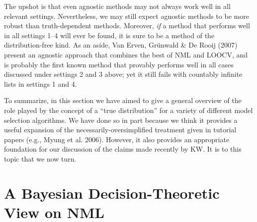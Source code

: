\documentclass[authoryear]{elsarticle}
\newcommand{\kw}{KW}
\begin{document}
The upshot is that even agnostic methods may not always work well in
all relevant settings. Nevertheless, we may still expect agnostic
methods to be more robust than truth-dependent methods. Moreover, {\em
  if\/} a method that performs well in all settings 1--4 will ever be
found, it is sure to be a method of the distribution-free kind. As an
aside, Van Erven, Gr\"unwald \& De Rooij (2007) present an agnostic
approach that combines the best of NML and LOOCV, and is probably the
first known method that provably performs well in all cases discussed
under settings 2 and 3 above; yet it still fails with countably
infinite lists in settings 1 and 4.

To summarize, in this section we have aimed to give a general
overview of the role played by the concept of a ``true distribution''
for a variety of different model selection algorithms. We have done so in
part because we think it provides a useful expansion of the
necessarily-oversimplified
treatment given in tutorial papers (e.g., Myung et al. 2006). However,
it also provides an appropriate foundation for our discussion of the
claims made recently by \kw. It is to this topic that we now turn.


\section{A Bayesian Decision-Theoretic View on NML}
\label{sec:kw}
\end{document}
